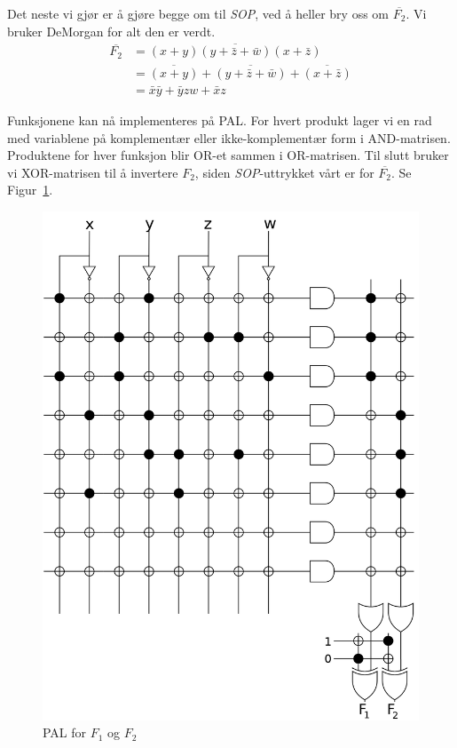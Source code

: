 \documentclass[12pt,a4paper,norsk]{article}
\begin{document}
Det neste vi gjør er å gjøre begge om til \textit{SOP}, ved å heller bry oss om
$\overline{F_2}$. Vi bruker DeMorgan for alt den er verdt.
\begin{align*}
  \overline{F_2} &= \overline{(x+y)(y+\bar{z}+\bar{w})(x+\bar{z})} \\
                 &= \overline{(x+y)} + \overline{(y+\bar{z}+\bar{w})} + \overline{(x+\bar{z})} \\
                 &= \bar{x}\bar{y} + \bar{y}zw + \bar{x}z
\end{align*}

Funksjonene kan nå implementeres på PAL. For hvert produkt lager vi en rad med
variablene på komplementær eller ikke-komplementær form i AND-matrisen.
Produktene for hver funksjon blir OR-et sammen i OR-matrisen. Til slutt bruker
vi XOR-matrisen til å invertere $F_2$, siden \textit{SOP}-uttrykket vårt er for
$\overline{F_2}$. Se Figur~\ref{fig:PAL}.

\begin{figure}[H]
  \centering
  \includegraphics[width=\textwidth,height=\textheight,keepaspectratio]{PAL}
  \caption{PAL for $F_1$ og $F_2$\label{fig:PAL}}
\end{figure}
\clearpage
\end{document}
